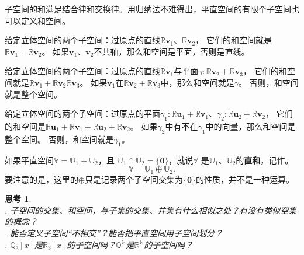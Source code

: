 \documentclass[12pt,UTF8]{ctexbook}
\theoremstyle{definition}
\theoremstyle{plain}
\newtheorem{sk}{思考}[section]
\begin{document}
子空间的和满足结合律和交换律。用归纳法不难得出，平直空间的有限个子空间也可以定义和空间。

给定立体空间的两个子空间：过原点的直线$\mathbb{R}\mathbf{v}_1$、$\mathbb{R}\mathbf{v}_2$，
它们的和空间就是$\mathbb{R}\mathbf{v}_1 + \mathbb{R}\mathbf{v}_2$。
如果$\mathbf{v}_1$、$\mathbf{v}_2$不共轴，那么和空间是平面，否则是直线。

给定立体空间的两个子空间：过原点的直线$\mathbb{R}\mathbf{v}_1$与平面$\gamma: \mathbb{R}\mathbf{v}_2 + \mathbb{R}\mathbf{v}_3$，
它们的和空间就是$\mathbb{R}\mathbf{v}_1 + \mathbb{R}\mathbf{v}_2 \mathbb{R}\mathbf{v}_3$。
如果$\mathbf{v}_1$在$\mathbb{R}\mathbf{v}_2 + \mathbb{R}\mathbf{v}_3$中，那么和空间就是$\gamma$。
否则，和空间就是整个空间。

给定立体空间的两个子空间：过原点的平面$\gamma_1: \mathbb{R}\mathbf{u}_1 + \mathbb{R}\mathbf{v}_1$、$\gamma_2: \mathbb{R}\mathbf{u}_2 + \mathbb{R}\mathbf{v}_2$，
它们的和空间是$\mathbb{R}\mathbf{u}_1 + \mathbb{R}\mathbf{v}_1 + \mathbb{R}\mathbf{u}_2 + \mathbb{R}\mathbf{v}_2$。
如果$\gamma_2$中有不在$\gamma_1$中的向量，那么和空间是整个空间。
否则，和空间就是$\gamma_1$。

如果平直空间$\mathbb{V} = \mathbb{U}_1 + \mathbb{U}_2$，且
$\mathbb{U}_1 \cap \mathbb{U}_2 = \{\mathbf{0}\}$，就说$\mathbb{V}$
是$\mathbb{U}_1$、$\mathbb{U}_2$的\textbf{直和}，记作。
$$\mathbb{V} = \mathbb{U}_1 \oplus \mathbb{U}_2.$$
要注意的是，这里的$\oplus$只是记录两个子空间交集为$\{\mathbf{0}\}$的性质，并不是一种运算。

\begin{sk}
    \mbox{} \\
    . 子空间的交集、和空间，与子集的交集、并集有什么相似之处？有没有类似空集的概念？\\
    . 能否定义子空间“不相交”？能否把平直空间用子空间划分？\\
    . $\mathbb{Q}_3[x]$是$\mathbb{R}_3[x]$的子空间吗？$\mathbb{Q}^\mathbb{N}$是$\mathbb{R}^\mathbb{N}$的子空间吗？
\end{sk}
\end{document}
